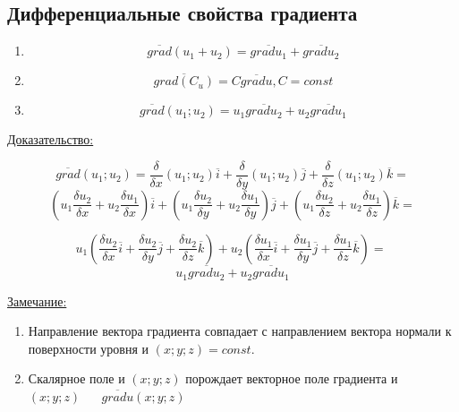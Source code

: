 \documentclass[12pt]{article}
\begin{document}
  \subsection*{Дифференциальные свойства градиента}
  \begin{enumerate}
    \item \[\overline{grad}(u_1+u_2)=\overline{grad u_1}+\overline{grad u_2}\]
    \item \[\overline{grad(C_u)}=C\overline{grad u}, C=const\]
    \item \[\overline{grad}(u_1;u_2)=u_1\overline{grad u_2}+u_2\overline{grad u_1}\]
  \end{enumerate}
  \underline{Доказательство:}
  \begin{adjustwidth}{1.5em}{1.5em}
    \[\overline{grad}(u_1;u_2)=
    \frac{\delta}{\delta x}(u_1;u_2)\overline{i}+\frac{\delta}{\delta y}(u_1;u_2)\overline{j}+\frac{\delta}{\delta z}(u_1;u_2)\overline{k}=\]\[
    (u_1 \frac{\delta u_2}{\delta x}+u_2\frac{\delta u_1}{\delta x})\overline{i} + (u_1 \frac{\delta u_2}{\delta y}+u_2\frac{\delta u_1}{\delta y})\overline{j} + (u_1\frac{\delta u_2}{\delta z}+u_2\frac{\delta u_1}{\delta z})\overline{k}=\]
  
    \[u_1(\frac{\delta u_2}{\delta x}\overline{i} +\frac{\delta u_2}{\delta y}\overline{j}+\frac{\delta u_2}{\delta z}\overline{k})+
  u_2(\frac{\delta u_1}{\delta x}\overline{i} +\frac{\delta u_1}{\delta y}\overline{j}+\frac{\delta u_1}{\delta z}\overline{k})=\
  \]\[u_1 \overline{grad u_2}+u_2 \overline{grad u_1}\]
  \end{adjustwidth}
  \underline{Замечание:}
  \begin{enumerate}
    \item Направление вектора градиента совпадает с направлением вектора нормали к поверхности уровня
    и $(x;y;z)=const.$
    \item Скалярное поле и $(x;y;z)$ порождает векторное поле градиента и $(x;y;z) \hspace{20pt} \overline{grad u}(x;y;z)$
  \end{enumerate}
\end{document}
